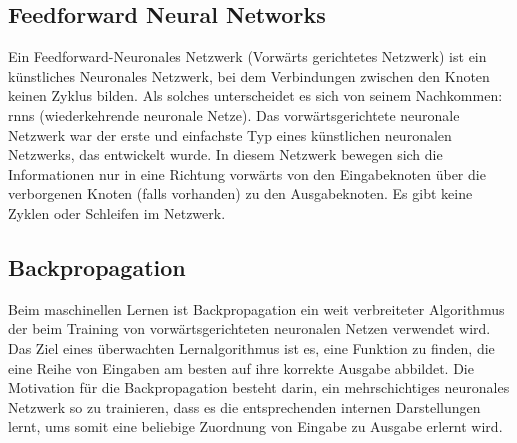 \documentclass[
        ngerman,
        paper=a4,
        numbers=noendperiod,
]{scrreprt}
\begin{document}

\subsection{Feedforward Neural Networks}
Ein Feedforward-Neuronales Netzwerk (Vorwärts gerichtetes Netzwerk) ist ein künstliches Neuronales Netzwerk, bei dem Verbindungen zwischen den Knoten keinen Zyklus bilden. Als solches unterscheidet es sich von seinem Nachkommen: \ac{rnn}s (wiederkehrende neuronale Netze). Das vorwärtsgerichtete neuronale Netzwerk war der erste und einfachste Typ eines künstlichen neuronalen Netzwerks, das entwickelt wurde. In diesem Netzwerk bewegen sich die Informationen nur in eine Richtung vorwärts von den Eingabeknoten über die verborgenen Knoten (falls vorhanden) zu den Ausgabeknoten. Es gibt keine Zyklen oder Schleifen im Netzwerk.
\subsection{Backpropagation}
Beim maschinellen Lernen ist Backpropagation ein weit verbreiteter Algorithmus der beim Training von vorwärtsgerichteten neuronalen Netzen verwendet wird. Das Ziel eines überwachten Lernalgorithmus ist es, eine Funktion zu finden, die eine Reihe von Eingaben am besten auf ihre korrekte Ausgabe abbildet. Die Motivation für die Backpropagation besteht darin, ein mehrschichtiges neuronales Netzwerk so zu trainieren, dass es die entsprechenden internen Darstellungen lernt, ums somit eine beliebige Zuordnung von Eingabe zu Ausgabe erlernt wird. 
\end{document}
